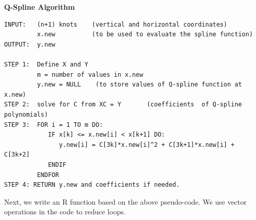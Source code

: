 \documentclass[
]{book}
\begin{document}
\hfill\break

\textbf{Q-Spline Algorithm}

\begin{verbatim}
INPUT:   (n+1) knots    (vertical and horizontal coordinates)
         x.new          (to be used to evaluate the spline function)
OUTPUT:  y.new

STEP 1:  Define X and Y 
         m = number of values in x.new
         y.new = NULL    (to store values of Q-spline function at x.new)
STEP 2:  solve for C from XC = Y       (coefficients  of Q-spline polynomials)
STEP 3:  FOR i = 1 TO m DO:
            IF x[k] <= x.new[i] < x[k+1] DO:
               y.new[i] = C[3k]*x.new[i]^2 + C[3k+1]*x.new[i] + C[3k+2]
            ENDIF
         ENDFOR
STEP 4: RETURN y.new and coefficients if needed.        
\end{verbatim}

\hfill\break

Next, we write an R function based on the above pseudo-code. We use vector operations in the code to reduce loops.

\hfill\break
\end{document}
